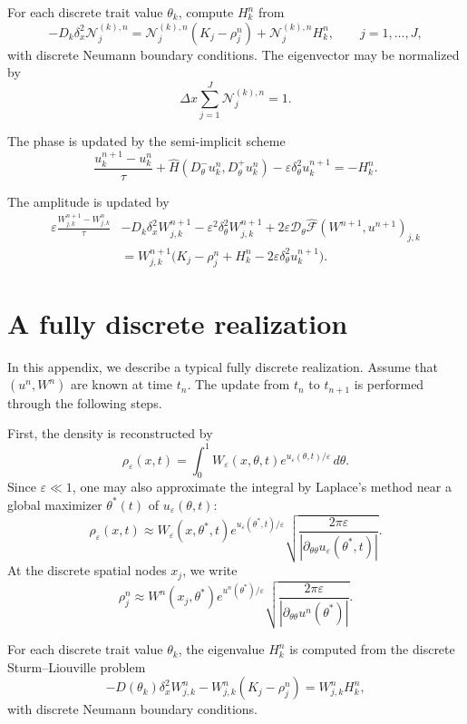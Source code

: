 \documentclass[11pt, dina4, amsfont12]{article}
\begin{document}
For each discrete trait value \(\theta_k\), compute \(H_k^n\) from
\[
-D_k\delta_x^2\mathcal N_j^{(k),n}
=
\mathcal N_j^{(k),n}(K_j-\rho_j^n)
+
\mathcal N_j^{(k),n}H_k^n,
\qquad
j=1,\dots,J,
\]
with discrete Neumann boundary conditions. The eigenvector may be normalized by
\[
\Delta x\sum_{j=1}^J\mathcal N_j^{(k),n}=1 .
\]

The phase is updated by the semi-implicit scheme
\[
\frac{u_k^{n+1}-u_k^n}{\tau}
+
\widehat H
\left(
D_\theta^-u_k^n,
D_\theta^+u_k^n
\right)
-
\varepsilon\delta_\theta^2u_k^{n+1}
=
-H_k^n .
\]

The amplitude is updated by
\begin{equation*}
\begin{aligned}
\varepsilon
\frac{W_{j,k}^{n+1}-W_{j,k}^n}{\tau}
&-
D_k\delta_x^2W_{j,k}^{n+1}
-
\varepsilon^2\delta_\theta^2W_{j,k}^{n+1}
+
2\varepsilon
\mathcal D_\theta
\widehat{\mathcal F}(W^{n+1},u^{n+1})_{j,k}
\\
&=
W_{j,k}^{n+1}
\bigl(
K_j-\rho_j^n
+
H_k^n
-
2\varepsilon\delta_\theta^2u_k^{n+1}
\bigr).
\end{aligned}
\end{equation*}

\section{A fully discrete realization}

In this appendix, we describe a typical fully discrete realization. Assume that $(u^n, W^n)$ are known at time $t_n$. The update from $t_n$ to $t_{n+1}$ is performed through the following steps.

First, the density is reconstructed by
\[
\rho_\varepsilon(x,t)
=
\int_0^1 W_\varepsilon(x,\theta,t)e^{u_\varepsilon(\theta,t)/\varepsilon}\,d\theta.
\]
Since $\varepsilon\ll 1$, one may also approximate the integral by Laplace's method near a global maximizer $\theta^*(t)$ of $u_\varepsilon(\theta,t)$:
\[
\rho_\varepsilon(x,t)
\approx
W_\varepsilon (x, \theta^*, t)
e^{u_\varepsilon(\theta^*,t)/\varepsilon}
\sqrt{\frac{2\pi\varepsilon}{|\partial_{\theta\theta}u_\varepsilon(\theta^*, t)|}}.
\]
At the discrete spatial nodes $x_j$, we write
\[
\rho_j^n
\approx
W^n(x_j, \theta^*) e^{u^n(\theta^*)/\varepsilon}
\sqrt{\frac{2\pi\varepsilon}{|\partial_{\theta\theta}u^n(\theta^*)|}}.
\]

For each discrete trait value $\theta_k$, the eigenvalue $H_k^n$ is computed from the discrete Sturm--Liouville problem
\[
-D(\theta_k)\delta_x^2W_{j,k}^n-W_{j,k}^n(K_j - \rho_j^n)=W_{j,k}^nH_k^n,
\]
with discrete Neumann boundary conditions.
\end{document}
